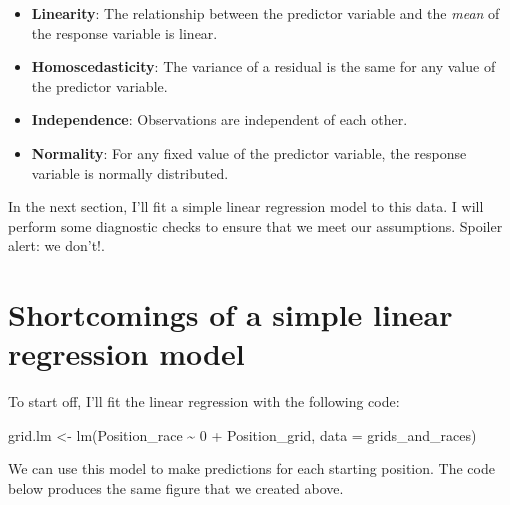 \documentclass[
]{book}
\newenvironment{Shaded}{\begin{snugshade}}{\end{snugshade}}
\newcommand{\AttributeTok}[1]{\textcolor[rgb]{0.77,0.63,0.00}{#1}}
\newcommand{\DecValTok}[1]{\textcolor[rgb]{0.00,0.00,0.81}{#1}}
\newcommand{\FunctionTok}[1]{\textcolor[rgb]{0.00,0.00,0.00}{#1}}
\newcommand{\NormalTok}[1]{#1}
\newcommand{\OtherTok}[1]{\textcolor[rgb]{0.56,0.35,0.01}{#1}}
\newcommand{\SpecialCharTok}[1]{\textcolor[rgb]{0.00,0.00,0.00}{#1}}
\providecommand{\tightlist}{%
  \setlength{\itemsep}{0pt}\setlength{\parskip}{0pt}}
\begin{document}
\begin{itemize}
\tightlist
\item
  \textbf{Linearity}: The relationship between the predictor variable and the \emph{mean} of the response variable is linear.
\item
  \textbf{Homoscedasticity}: The variance of a residual is the same for any value of the predictor variable.
\item
  \textbf{Independence}: Observations are independent of each other.
\item
  \textbf{Normality}: For any fixed value of the predictor variable, the response variable is normally distributed.
\end{itemize}

In the next section, I'll fit a simple linear regression model to this data. I will perform some diagnostic checks to ensure that we meet our assumptions. Spoiler alert: we don't!.

\hypertarget{shortcomings-of-a-simple-linear-regression-model}{%
\section{Shortcomings of a simple linear regression model}\label{shortcomings-of-a-simple-linear-regression-model}}

To start off, I'll fit the linear regression with the following code:

\begin{Shaded}
\begin{Highlighting}[]
\NormalTok{grid.lm }\OtherTok{\textless{}{-}} \FunctionTok{lm}\NormalTok{(Position\_race }\SpecialCharTok{\textasciitilde{}} \DecValTok{0} \SpecialCharTok{+}\NormalTok{ Position\_grid, }\AttributeTok{data =}\NormalTok{ grids\_and\_races)}
\end{Highlighting}
\end{Shaded}

We can use this model to make predictions for each starting position. The code below produces the same figure that we created above.
\end{document}
